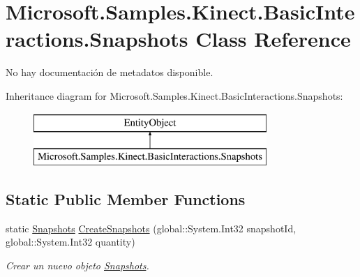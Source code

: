 \hypertarget{class_microsoft_1_1_samples_1_1_kinect_1_1_basic_interactions_1_1_snapshots}{\section{Microsoft.\-Samples.\-Kinect.\-Basic\-Interactions.\-Snapshots Class Reference}
\label{class_microsoft_1_1_samples_1_1_kinect_1_1_basic_interactions_1_1_snapshots}
}


No hay documentación de metadatos disponible.  


Inheritance diagram for Microsoft.\-Samples.\-Kinect.\-Basic\-Interactions.\-Snapshots\-:\begin{figure}[H]
\begin{center}
\leavevmode
\includegraphics[height=2.000000cm]{class_microsoft_1_1_samples_1_1_kinect_1_1_basic_interactions_1_1_snapshots}
\end{center}
\end{figure}
\subsection*{Static Public Member Functions}
\begin{DoxyCompactItemize}
\item 
static \hyperlink{class_microsoft_1_1_samples_1_1_kinect_1_1_basic_interactions_1_1_snapshots}{Snapshots} \hyperlink{class_microsoft_1_1_samples_1_1_kinect_1_1_basic_interactions_1_1_snapshots_a809119c24b059557170ab8b45050144d}{Create\-Snapshots} (global\-::\-System.\-Int32 snapshot\-Id, global\-::\-System.\-Int32 quantity)
\begin{DoxyCompactList}\small\item\em Crear un nuevo objeto \hyperlink{class_microsoft_1_1_samples_1_1_kinect_1_1_basic_interactions_1_1_snapshots}{Snapshots}. \end{DoxyCompactList}\end{DoxyCompactItemize}
